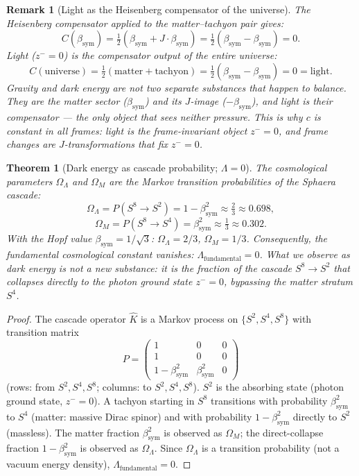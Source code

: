 \documentclass[12pt,a4paper]{article}
\newtheorem{theorem}{Theorem}[section]
\newtheorem*{remark}{Remark}
\newcommand{\bsym}{\beta_{\mathrm{sym}}}
\newcommand{\zminus}{z^-}
\begin{document}
\begin{remark}[Light as the Heisenberg compensator of the universe]
The Heisenberg compensator applied to the matter--tachyon pair gives:
\[
  C(\bsym) = \tfrac{1}{2}(\bsym+J\cdot\bsym)
           = \tfrac{1}{2}(\bsym-\bsym) = 0.
\]
Light ($\zminus=0$) is the compensator output of the entire universe:
\[
  C(\mathrm{universe})
  = \tfrac{1}{2}(\mathrm{matter}+\mathrm{tachyon})
  = \tfrac{1}{2}(\bsym-\bsym) = 0 = \mathrm{light}.
\]
Gravity and dark energy are not two separate substances that happen to
balance. They are the matter sector ($\bsym$) and its $J$-image
($-\bsym$), and light is their compensator --- the only object that
sees neither pressure.
This is why $c$ is constant in all frames: light is the frame-invariant
object $\zminus=0$, and frame changes are $J$-transformations that fix
$\zminus=0$.
\end{remark}

\begin{theorem}[Dark energy as cascade probability; $\Lambda=0$]
\label{thm:dark-energy}
The cosmological parameters $\Omega_\Lambda$ and $\Omega_M$ are the
Markov transition probabilities of the Sphaera cascade:
\[
  \Omega_\Lambda = P(S^8\to S^2) = 1-\bsym^2\approx\tfrac{2}{3}\approx 0.698,
\]
\[
  \Omega_M = P(S^8\to S^4) = \bsym^2\approx\tfrac{1}{3}\approx 0.302.
\]
With the Hopf value $\bsym=1/\sqrt{3}$:
$\Omega_\Lambda=2/3$, $\Omega_M=1/3$.
Consequently, the fundamental cosmological constant vanishes:
$\Lambda_{\mathrm{fundamental}}=0$.
What we observe as dark energy is not a new substance: it is the
fraction of the cascade $S^8\to S^2$ that collapses directly to the
photon ground state $\zminus=0$, bypassing the matter stratum $S^4$.
\end{theorem}

\begin{proof}
The cascade operator $\hat{K}$ is a Markov process on $\{S^2,S^4,S^8\}$
with transition matrix
\[
  P = \begin{pmatrix} 1 & 0 & 0 \\ 1 & 0 & 0 \\ 1-\bsym^2 & \bsym^2 & 0 \end{pmatrix}
\]
(rows: from $S^2,S^4,S^8$; columns: to $S^2,S^4,S^8$).
$S^2$ is the absorbing state (photon ground state, $\zminus=0$).
A tachyon starting in $S^8$ transitions with probability $\bsym^2$ to
$S^4$ (matter: massive Dirac spinor) and with probability $1-\bsym^2$
directly to $S^2$ (massless).
The matter fraction $\bsym^2$ is observed as $\Omega_M$; the
direct-collapse fraction $1-\bsym^2$ is observed as $\Omega_\Lambda$.
Since $\Omega_\Lambda$ is a transition probability (not a vacuum energy
density), $\Lambda_{\mathrm{fundamental}}=0$.
\end{proof}
\end{document}
